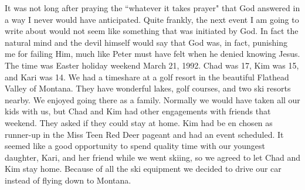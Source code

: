 \documentclass[oneside]{book}
\begin{document}
It was not long after praying the ``whatever it takes prayer" that God answered in a way I never would have anticipated. Quite frankly, the next event I am going to write about would not seem like something that was initiated by God. In fact the natural mind and the devil himself would say that God was, in fact, punishing me for failing Him, much like Peter must have felt when he denied knowing Jesus. The time was Easter holiday weekend March 21, 1992. Chad was 17, Kim was 15, and Kari was 14. We had a timeshare at a golf resort in the beautiful Flathead Valley of Montana. They have wonderful lakes, golf courses, and two ski resorts nearby. We enjoyed going there as a family. Normally we would have taken all our kids with us, but Chad and Kim had other engagements with friends that weekend. They asked if they could stay at home. Kim had be
en chosen as runner-up in the Miss Teen Red Deer pageant and had an event scheduled. It seemed like a good opportunity to spend quality time with our youngest daughter, Kari, and her friend while we went skiing, so we agreed to let Chad and Kim stay home. Because of all the ski equipment we decided to drive our car instead of flying down to Montana. 
\end{document}
